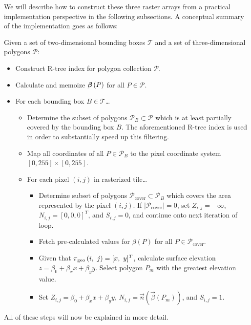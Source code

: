 We will describe how to construct these three raster arrays from a practical implementation perspective in the following subsections.
A conceptual summary of the implementation goes as follows:
\begin{leftbar}
  \noindent
  Given a set of two-dimensional bounding boxes $\mathcal{T}$ and a set of three-dimensional polygons $\mathcal{P}$:
  \begin{itemize}[nosep,leftmargin=*]
    \item Construct R-tree index for polygon collection $\mathcal{P}$.
    \item Calculate and memoize $\boldsymbol{\beta}\left(P\right)$ for all $P \in \mathcal{P}$.
    \item For each bounding box $B \in \mathcal{T}$\ldots
    \begin{itemize}[nosep,leftmargin=0.5cm]
      \item Determine the subset of polygons $\mathcal{P}_B \subset \mathcal{P}$ which is at least partially covered by the bounding box $B$.
        The aforementioned R-tree index is used in order to substantially speed up this filtering.
      \item Map all coordinates of all $P \in \mathcal{P}_B$ to the pixel coordinate system $\left[0, 255\right] \times \left[0, 255\right]$.
      \item For each pixel $(i, j)$ in rasterized tile\ldots
      \begin{itemize}[nosep,leftmargin=0.5cm]
        \item Determine subset of polygons $\mathcal{P}_{\mathrm{cover}} \subset \mathcal{P}_B$ which covers the area represented by the pixel $(i, j)$.
          If $|\mathcal{P}_{\mathrm{cover}}| = 0$, set $Z_{i,j} = -\infty$, $N_{i, j} = {[0, 0, 0]}^T$, and $S_{i, j} = 0$, and continue onto next iteration of loop.
        \item Fetch pre-calculated values for $\beta(P)$ for all $P \in \mathcal{P}_{\mathrm{cover}}$.
        \item Given that $\pi_{\mathrm{geo}}\left(i,~j\right) = [x,~y]^T$, calculate surface elevation $z = \beta_0 + \beta_x x + \beta_y y$.
          Select polygon $P_m$ with the greatest elevation value.
        \item Set $Z_{i,j} = \beta_0 + \beta_x x + \beta_y y$, $N_{i, j} = \vec{n}\left(\vec{\beta}(P_m)\right)$, and $S_{i, j} = 1$.
      \end{itemize}
    \end{itemize}
  \end{itemize}
\end{leftbar}
\noindent
All of these steps will now be explained in more detail.

